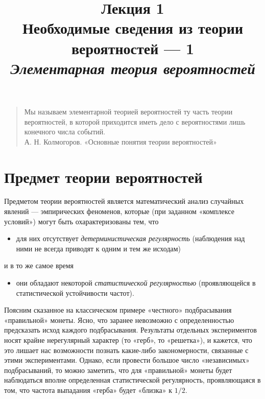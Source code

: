\documentclass[11pt,a4paper]{article}
\title{
    Лекция 1 \\
    Необходимые сведения из теории вероятностей --- 1 \\
    \emph{\large Элементарная теория вероятностей}
  }
\providecommand{\tightlist}{%
      \setlength{\itemsep}{0pt}\setlength{\parskip}{0pt}}
\begin{document}
    
\maketitle


\begin{quote}
Мы называем элементарной теорией вероятностей ту часть теории
вероятностей, в которой приходится иметь дело с вероятностями лишь
конечного числа событий.\\
А. Н. Колмогоров. «Основные понятия теории вероятностей»
\end{quote}

\tableofcontents
\pagebreak



    \hypertarget{ux43fux440ux435ux434ux43cux435ux442-ux442ux435ux43eux440ux438ux438-ux432ux435ux440ux43eux44fux442ux43dux43eux441ux442ux435ux439}{%
\section{Предмет теории
вероятностей}\label{ux43fux440ux435ux434ux43cux435ux442-ux442ux435ux43eux440ux438ux438-ux432ux435ux440ux43eux44fux442ux43dux43eux441ux442ux435ux439}}

    Предметом теории вероятностей является математический анализ случайных
явлений --- эмпирических феноменов, которые (при заданном «комплексе
условий») могут быть охарактеризованы тем, что

\begin{itemize}
\tightlist
\item
  для них отсутствует \emph{детерминистическая регулярность} (наблюдения
  над ними не всегда приводят к одним и тем же исходам)
\end{itemize}

и в то же самое время

\begin{itemize}
\tightlist
\item
  они обладают некоторой \emph{статистической регулярностью}
  (проявляющейся в статистической устойчивости частот).
\end{itemize}

    Поясним сказанное на классическом примере «честного» подбрасывания
«правильной» монеты. Ясно, что заранее невозможно с определенностью
предсказать исход каждого подбрасывания. Результаты отдельных
экспериментов носят крайне нерегулярный характер (то «герб», то
«решетка»), и кажется, что это лишает нас возможности познать какие-либо
закономерности, связанные с этими экспериментами. Однако, если провести
большое число «независимых» подбрасываний, то можно заметить, что для
«правильной» монеты будет наблюдаться вполне определенная статистической
регулярность, проявляющаяся в том, что частота выпадания «герба» будет
«близка» к \(1/2\).
\end{document}
